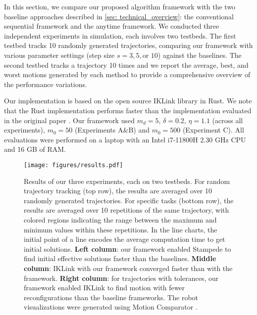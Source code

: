 
In this section, we compare our proposed algorithm framework with the two baseline approaches described in \cref{sec: technical_overview}: the conventional sequential framework and the \naive anytime framework. We conducted three independent experiments in simulation, 
each involves two testbeds. The first testbed tracks 10 randomly generated trajectories, comparing our framework with various parameter settings (step size $s{=}3,5, \text{or } 10$) against the baselines. The second testbed tracks a trajectory 10 times and we report the average, best, and worst motions generated by each method to provide
a comprehensive overview of the performance variations.

Our implementation is based on the open source IKLink library  in Rust. We note that the Rust implementation performs faster than the implementation evaluated in the original paper \cite{wang2024iklink}. 
Our framework used $m_d {=} 5$,  $\delta{=}0.2$, $\eta {=} 1.1$ (across all experiments), $m_0 {=} 50$ (Experiments A$\&$B) and $m_0 {=} 500$ (Experiment C).
All evaluations were performed on a laptop with an Intel i7-11800H 2.30 GHz CPU and 16 GB of RAM.

\begin{figure*}[!tb]
\texttt{[image: figures/results.pdf]}
\vspace{-2mm}
\caption{Results of our three experiments, each on two testbeds. For random trajectory tracking (top row), the results are averaged over 10 randomly generated trajectories. For specific tasks (bottom row), the results are averaged over 10 repetitions of the same trajectory, with colored regions indicating the range between the maximum and minimum values within these repetitions. 
In the line charts, the initial point of a line encodes the average computation time to get initial solutions. 
\textbf{Left column}: our framework enabled Stampede to find initial effective solutions faster than the baselines. \textbf{Middle column}: IKLink with our framework converged faster than with the \naive framework. \textbf{Right column}: for trajectories with tolerances, our framework enabled IKLink to find motion with fewer reconfigurations than the baseline frameworks. The robot visualizations were generated using Motion Comparator \cite{wang2024motion}\protect\footnotemark.
}
\label{fig:results}
\vspace{-3mm}
\end{figure*}

